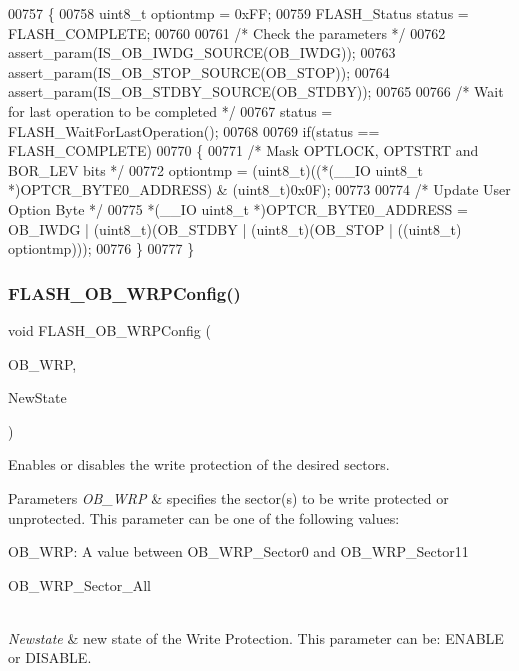 \begin{DoxyCode}
00757 \{
00758   uint8\_t optiontmp = 0xFF;
00759   FLASH_Status status = FLASH_COMPLETE; 
00760 
00761   \textcolor{comment}{/* Check the parameters */}
00762   assert_param(IS_OB_IWDG_SOURCE(OB\_IWDG));
00763   assert_param(IS_OB_STOP_SOURCE(OB\_STOP));
00764   assert_param(IS_OB_STDBY_SOURCE(OB\_STDBY));
00765 
00766   \textcolor{comment}{/* Wait for last operation to be completed */}
00767   status = FLASH_WaitForLastOperation();
00768   
00769   \textcolor{keywordflow}{if}(status == FLASH_COMPLETE)
00770   \{ 
00771     \textcolor{comment}{/* Mask OPTLOCK, OPTSTRT and BOR\_LEV bits */}
00772     optiontmp =  (uint8\_t)((*(\_\_IO uint8\_t *)OPTCR_BYTE0_ADDRESS) & (uint8\_t)0x0F); 
00773 
00774     \textcolor{comment}{/* Update User Option Byte */}
00775     *(\_\_IO uint8\_t *)OPTCR\_BYTE0\_ADDRESS = OB\_IWDG | (uint8\_t)(OB\_STDBY | (uint8\_t)(OB\_STOP | ((uint8\_t)
      optiontmp))); 
00776   \}  
00777 \}
\end{DoxyCode}
\mbox{\label{group__FLASH_gaffe7e91bcce65ac079ae5afa1db568b5}} 
\subsubsection{F\+L\+A\+S\+H\+\_\+\+O\+B\+\_\+\+W\+R\+P\+Config()}
{\footnotesize\ttfamily void F\+L\+A\+S\+H\+\_\+\+O\+B\+\_\+\+W\+R\+P\+Config (\begin{DoxyParamCaption}\item[{uint32\+\_\+t}]{O\+B\+\_\+\+W\+RP,  }\item[{\textbf{ Functional\+State}}]{New\+State }\end{DoxyParamCaption})}



Enables or disables the write protection of the desired sectors. 


\begin{DoxyParams}{Parameters}
{\em O\+B\+\_\+\+W\+RP} & specifies the sector(s) to be write protected or unprotected. This parameter can be one of the following values\+: \begin{DoxyItemize}
\item O\+B\+\_\+\+W\+RP\+: A value between O\+B\+\_\+\+W\+R\+P\+\_\+\+Sector0 and O\+B\+\_\+\+W\+R\+P\+\_\+\+Sector11 \item O\+B\+\_\+\+W\+R\+P\+\_\+\+Sector\+\_\+\+All \end{DoxyItemize}
\\
\hline
{\em Newstate} & new state of the Write Protection. This parameter can be\+: E\+N\+A\+B\+LE or D\+I\+S\+A\+B\+LE. \\
\hline
\end{DoxyParams}

